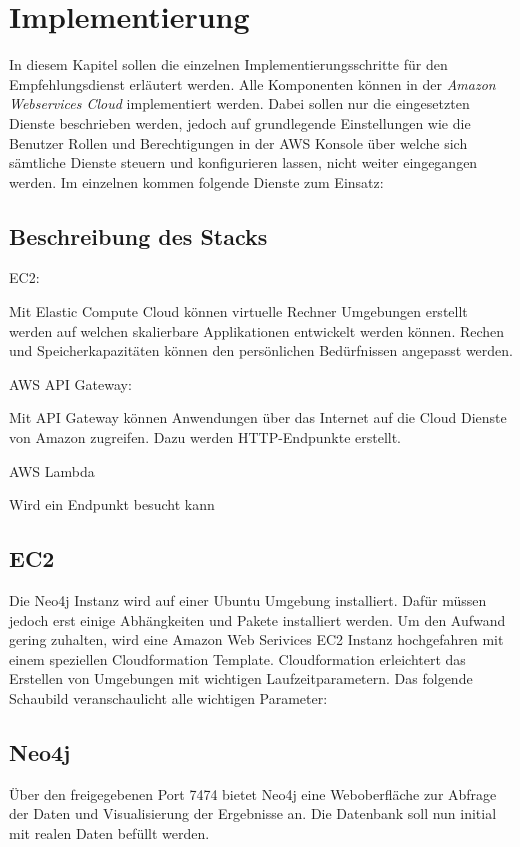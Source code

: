 \section{Implementierung}\label{implementaion}


 In diesem Kapitel sollen die einzelnen Implementierungsschritte für den Empfehlungsdienst erläutert werden. Alle Komponenten können in der \textit{Amazon Webservices Cloud} implementiert werden. Dabei sollen nur die eingesetzten Dienste beschrieben werden, jedoch auf grundlegende Einstellungen wie die Benutzer Rollen und Berechtigungen in der AWS Konsole über welche sich sämtliche Dienste steuern und konfigurieren lassen, nicht weiter eingegangen werden. Im einzelnen kommen folgende Dienste zum Einsatz:

\subsection{Beschreibung des Stacks}

EC2:

Mit Elastic Compute Cloud können virtuelle Rechner Umgebungen erstellt werden auf welchen skalierbare Applikationen entwickelt werden können. Rechen und Speicherkapazitäten können den persönlichen Bedürfnissen angepasst werden. 

AWS API Gateway:

Mit API Gateway können Anwendungen über das Internet auf die Cloud Dienste von Amazon zugreifen. Dazu werden HTTP-Endpunkte erstellt.

AWS Lambda

Wird ein Endpunkt besucht kann 
   \subsection{EC2 }

Die Neo4j Instanz wird auf einer Ubuntu Umgebung installiert. Dafür müssen jedoch erst einige Abhängkeiten und Pakete installiert werden. Um den Aufwand gering zuhalten, wird eine Amazon Web Serivices EC2 Instanz hochgefahren mit einem speziellen Cloudformation Template. Cloudformation erleichtert das Erstellen von Umgebungen mit wichtigen Laufzeitparametern. Das folgende Schaubild veranschaulicht alle wichtigen Parameter:

\subsection{Neo4j}

Über den freigegebenen Port 7474 bietet Neo4j eine Weboberfläche zur Abfrage der Daten und Visualisierung der Ergebnisse an. Die Datenbank soll nun initial mit realen Daten befüllt werden. 

